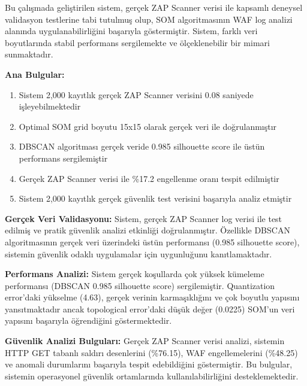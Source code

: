 Bu çalışmada geliştirilen sistem, gerçek ZAP Scanner verisi ile kapsamlı deneysel validasyon testlerine tabi tutulmuş olup, SOM algoritmasının WAF log analizi alanında uygulanabilirliğini başarıyla göstermiştir. Sistem, farklı veri boyutlarında stabil performans sergilemekte ve ölçeklenebilir bir mimari sunmaktadır.

\textbf{Ana Bulgular:}
\begin{enumerate}
    \item Sistem 2,000 kayıtlık gerçek ZAP Scanner verisini 0.08 saniyede işleyebilmektedir
    \item Optimal SOM grid boyutu 15x15 olarak gerçek veri ile doğrulanmıştır
    \item DBSCAN algoritması gerçek veride 0.985 silhouette score ile üstün performans sergilemiştir
    \item Gerçek ZAP Scanner verisi ile \%17.2 engellenme oranı tespit edilmiştir
    \item Sistem 2,000 kayıtlık gerçek güvenlik test verisini başarıyla analiz etmiştir
\end{enumerate}

\textbf{Gerçek Veri Validasyonu:} Sistem, gerçek ZAP Scanner log verisi ile test edilmiş ve pratik güvenlik analizi etkinliği doğrulanmıştır. Özellikle DBSCAN algoritmasının gerçek veri üzerindeki üstün performansı (0.985 silhouette score), sistemin güvenlik odaklı uygulamalar için uygunluğunu kanıtlamaktadır.

\textbf{Performans Analizi:} Sistem gerçek koşullarda çok yüksek kümeleme performansı (DBSCAN 0.985 silhouette score) sergilemiştir. Quantization error'daki yükselme (4.63), gerçek verinin karmaşıklığını ve çok boyutlu yapısını yansıtmaktadır ancak topological error'daki düşük değer (0.0225) SOM'un veri yapısını başarıyla öğrendiğini göstermektedir.

\textbf{Güvenlik Analizi Bulguları:} Gerçek ZAP Scanner verisi analizi, sistemin HTTP GET tabanlı saldırı desenlerini (\%76.15), WAF engellemelerini (\%48.25) ve anomali durumlarını başarıyla tespit edebildiğini göstermiştir. Bu bulgular, sistemin operasyonel güvenlik ortamlarında kullanılabilirliğini desteklemektedir.

